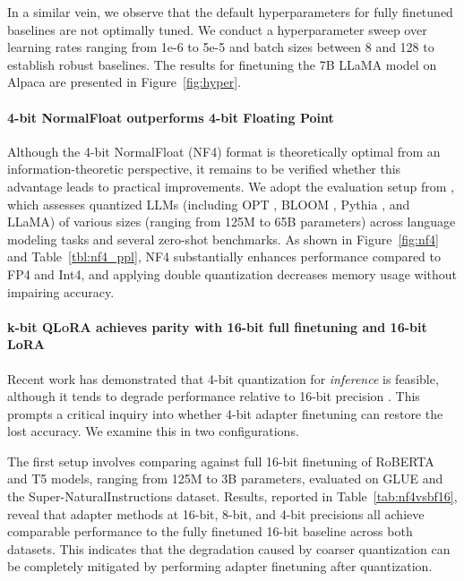 In a similar vein, we observe that the default hyperparameters for fully finetuned baselines are not optimally tuned. We conduct a hyperparameter sweep over learning rates ranging from 1e-6 to 5e-5 and batch sizes between 8 and 128 to establish robust baselines. The results for finetuning the 7B LLaMA model on Alpaca are presented in Figure~\ref{fig:hyper}.

\paragraph{4-bit NormalFloat outperforms 4-bit Floating Point}

Although the 4-bit NormalFloat (NF4) format is theoretically optimal from an information-theoretic perspective, it remains to be verified whether this advantage leads to practical improvements. We adopt the evaluation setup from \citet{dettmers2022case}, which assesses quantized LLMs (including OPT \citep{zhang2022opt}, BLOOM \citep{scao2022bloom}, Pythia \citep{biderman2023pythia}, and LLaMA) of various sizes (ranging from 125M to 65B parameters) across language modeling tasks and several zero-shot benchmarks. As shown in Figure~\ref{fig:nf4} and Table~\ref{tbl:nf4_ppl}, NF4 substantially enhances performance compared to FP4 and Int4, and applying double quantization decreases memory usage without impairing accuracy.

\paragraph{k-bit \textsc{QLoRA} achieves parity with 16-bit full finetuning and 16-bit LoRA}

Recent work has demonstrated that 4-bit quantization for \emph{inference} is feasible, although it tends to degrade performance relative to 16-bit precision \citep{dettmers2022case,frantar2022gptq}. This prompts a critical inquiry into whether 4-bit adapter finetuning can restore the lost accuracy. We examine this in two configurations.

The first setup involves comparing against full 16-bit finetuning of RoBERTA and T5 models, ranging from 125M to 3B parameters, evaluated on GLUE and the Super-NaturalInstructions dataset. Results, reported in Table~\ref{tab:nf4vsbf16}, reveal that adapter methods at 16-bit, 8-bit, and 4-bit precisions all achieve comparable performance to the fully finetuned 16-bit baseline across both datasets. This indicates that the degradation caused by coarser quantization can be completely mitigated by performing adapter finetuning after quantization.

